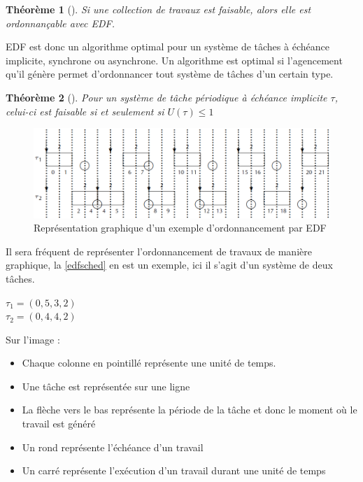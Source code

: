 \documentclass[12pt,a4paper,oneside]{book}
\theoremstyle{break}
\theoremstyle{breakplain}
\newtheorem{theo}{Théorème}[chapter]
\begin{document}
\begin{theo}[\cite{goossens2014os}]
Si une collection de travaux est faisable, alors elle est ordonnançable avec EDF.
\end{theo}

EDF est donc un algorithme optimal pour un système de tâches à échéance implicite, synchrone ou asynchrone. Un algorithme est optimal si l'agencement qu'il génère permet d'ordonnancer tout système de tâches d'un certain type.\\

\begin{theo}[\cite{liu1973scheduling}]
Pour un système de tâche périodique à échéance implicite $\tau$, celui-ci est faisable si et seulement si $U(\tau) \leq 1$
\end{theo}

\begin{figure}[h]
\includegraphics[width = \textwidth]{images/schedexample.png}
\caption{Représentation graphique d'un exemple d'ordonnancement par EDF \cite{goossens2014os}}
\label{edfsched}
\end{figure}

Il sera fréquent de représenter l'ordonnancement de travaux de manière graphique, la \autoref{edfsched} en est un exemple, ici il s'agit d'un système de deux tâches.
\begin{center}
$ \tau_1 = (0, 5, 3, 2) $\\
$ \tau_2 = (0, 4, 4, 2) $
\end{center}
Sur l'image :
\begin{itemize}
\item Chaque colonne en pointillé représente une unité de temps.
\item Une tâche est représentée sur une ligne
\item La flèche vers le bas représente la période de la tâche et donc le moment où le travail est généré
\item Un rond représente l'échéance d'un travail
\item Un carré représente l'exécution d'un travail durant une unité de temps
\end{itemize}
\end{document}
